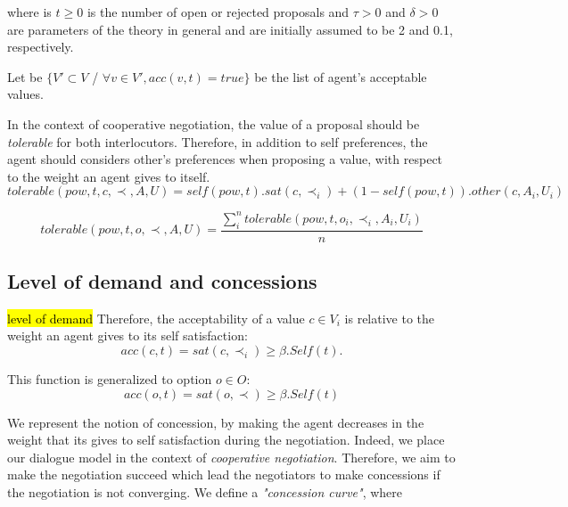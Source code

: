 \documentclass{llncs}
\begin{document}
	where is $t \geq 0$ is the number of open or rejected proposals and $\tau > 0$ and $\delta > 0$
	are parameters of the theory in general and are initially assumed to
	be 2 and 0.1, respectively.
	
	Let be	$\{V' \subset V$ / $\forall v \in V', acc(v,t) = true\}$ be the list of agent's acceptable values. 
	
		In the context of cooperative negotiation, the value of a proposal should be \textit{tolerable} for both interlocutors. Therefore, in addition to self preferences, the agent should considers other's preferences when proposing a value, with respect to the weight an agent gives to itself.
	\begin{equation}
	 tolerable(pow, t, c, \prec, A, U) = self(pow, t) . sat(c, \prec_i)  +  (1 - self(pow, t)) . other(c, A_i, U_i)
	\end{equation}
	
	\begin{equation}
	tolerable(pow, t, o, \prec, A, U) = \frac{ \sum_{i}^{n} tolerable(pow, t, o_i, \prec_i, A_i, U_i) } {n}
	\end{equation}
	
	\subsection{Level of demand and concessions}
	
	\hl{level of demand}
				Therefore, the acceptability of a value $c \in V_i$  is relative to the weight an agent gives to its self satisfaction:
				\begin{equation}
				acc(c, t) = sat(c, \prec_i) \geq  \beta . Self(t).
				\end{equation}
				
				This function is generalized to option $o \in O$:
				\begin{equation}
				acc(o, t) = sat(o, \prec) \geq  \beta . Self(t)
				\end{equation}
	
		We represent the notion of concession, by making the agent decreases in the weight that its gives to self satisfaction during the negotiation. Indeed, we place our dialogue model in the context of \textit{cooperative negotiation}. Therefore, we aim to make the negotiation succeed which lead the negotiators  to make concessions if the negotiation is not converging. We define a \emph{"concession curve"}, where 
		
\end{document}
